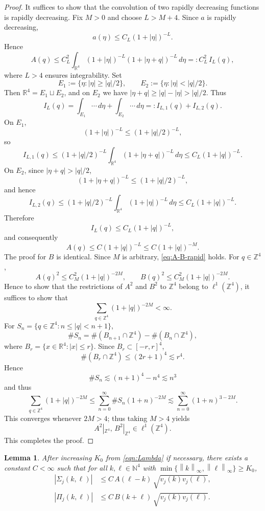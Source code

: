 \documentclass[11pt, reqno]{amsart}
\newtheorem{lemma}{Lemma}
\theoremstyle{remark}
\newcommand{\R}{\mathbb{R}}
\newcommand{\N}{\mathbb{N}}
\newcommand{\Z}{\mathbb{Z}}
\newcommand{\1}{\mathbf{1}}
\newcommand{\abs}[1]{\left\lvert #1 \right\rvert}
\newcommand{\norm}[1]{\left\lVert #1 \right\rVert}
\begin{document}
\begin{proof}
It suffices to show that the convolution of two rapidly decreasing functions is rapidly decreasing. Fix $M>0$ and choose $L>M+4$. Since $a$ is rapidly decreasing,
\[
a(\eta)\le C_L(1+|\eta|)^{-L}.
\]
Hence
\[
A(q)\le C_L^2 \int_{\R^4}(1+|\eta|)^{-L}(1+|\eta+q|)^{-L}\,d\eta
=: C_L^2\, I_L(q),
\]
where $L>4$ ensures integrability. Set
\[
E_1:=\{\eta:|\eta|\ge |q|/2\},
\qquad
E_2:=\{\eta:|\eta|<|q|/2\}.
\]
Then $\R^4=E_1\sqcup E_2$, and on $E_2$ we have $|\eta+q|\ge |q|-|\eta|>|q|/2$. Thus
\[
I_L(q)=\int_{E_1}\cdots\,d\eta+\int_{E_2}\cdots\,d\eta=:I_{L,1}(q)+I_{L,2}(q).
\]
On $E_1$,
\[
(1+|\eta|)^{-L}\le (1+|q|/2)^{-L},
\]
so
\[
I_{L,1}(q)
\le
(1+|q|/2)^{-L}\int_{\R^4}(1+|\eta+q|)^{-L}\,d\eta
\le C_L(1+|q|)^{-L}.
\]
On $E_2$, since $|\eta+q|>|q|/2$,
\[
(1+|\eta+q|)^{-L}\le (1+|q|/2)^{-L},
\]
and hence
\[
I_{L,2}(q)
\le
(1+|q|/2)^{-L}\int_{\R^4}(1+|\eta|)^{-L}\,d\eta
\le C_L(1+|q|)^{-L}.
\]
Therefore
\[
I_L(q)\le C_L(1+|q|)^{-L},
\]
and consequently
\[
A(q)\le C(1+|q|)^{-L}\le C(1+|q|)^{-M}.
\]
The proof for $B$ is identical. Since $M$ is arbitrary, \eqref{eq:A-B-rapid} holds. 
For \(q\in \mathbb Z^4\), 
\[
A(q)^2 \le C_M^2 (1+|q|)^{-2M},
\qquad
B(q)^2 \le C_M^2 (1+|q|)^{-2M}.
\]
Hence to show that the restrictions of $A^2$ and $B^2$ to $\Z^4$ belong to $\ell^1(\Z^4)$, it suffices to show that
\[
\sum_{q\in \mathbb Z^4} (1+|q|)^{-2M}<\infty.
\]
For \(S_n=\{q\in\mathbb Z^4:n\le |q|<n+1\}\),
\[
\#S_n
=
\#(B_{n+1}\cap\mathbb Z^4)-\#(B_n\cap\mathbb Z^4),
\]
where \(B_r=\{x\in\mathbb R^4:|x|\le r\}\).
Since \(B_r\subset[-r,r]^4\),
\[
\#(B_r\cap\mathbb Z^4)\le (2r+1)^4\lesssim r^4.
\]
Hence
\[
\#S_n\lesssim (n+1)^4-n^4\lesssim n^3 
\] 
and thus \[
\sum_{q\in \mathbb Z^4}(1+|q|)^{-2M}
\le
\sum_{n=0}^\infty \#S_n (1+n)^{-2M}
\lesssim
\sum_{n=0}^\infty (1+n)^{3-2M}.
\]
This converges whenever \(2M>4\); thus taking \(M>4\) yields
\[
A^2|_{\mathbb Z^4},\,B^2|_{\mathbb Z^4}\in \ell^1(\mathbb Z^4).
\]
This completes the proof.
\end{proof}
\begin{lemma}\label{lem:off-diagonal-bounds}
After increasing $K_0$ from \eqref{eqn:Lambda} if necessary, there exists a constant $C<\infty$ such that for all $k,\ell\in\N^4$ with $\min\{\norm{k}_\infty,\norm{\ell}_\infty\}\ge K_0$,
\begin{align}
\abs{\Sigma_j(k,\ell)} &\le C\,A(\ell-k)\,\sqrt{v_j(k)v_j(\ell)},
\label{eq:Sigma-bound}
\\
\abs{\Pi_j(k,\ell)} &\le C\,B(k+\ell)\,\sqrt{v_j(k)v_j(\ell)}.
\label{eq:Pi-bound}
\end{align}
\end{lemma}
\end{document}
